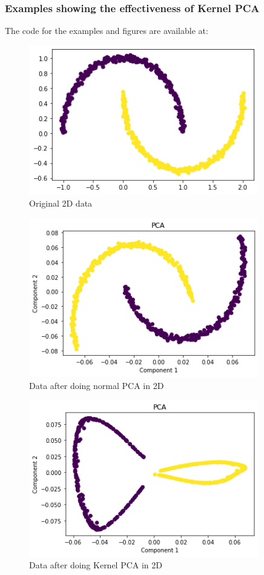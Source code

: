 \documentclass[../main.tex]{subfiles}
\begin{document}
\subsubsection{Examples showing the effectiveness of Kernel PCA}
The code for the examples and figures are available at:
    \begin{figure}[htp]
    \centering
    \includegraphics[width=10cm]{H2.png}
    \caption{Original 2D data}
    \label{Original 2D data}
    \end{figure}
    \begin{figure}[htp]
    \centering
    \includegraphics[width=10cm]{H3.png}
    \caption{Data after doing normal PCA in 2D}
    \label{Data after doing normal PCA in 2D}
    \end{figure}
\begin{figure}[htp]
    \centering
    \includegraphics[width=10cm]{H4.png}
    \caption{Data after doing Kernel PCA in 2D}
    \label{Data after doing Kernel PCA in 2D}
    \end{figure}
\end{document}
